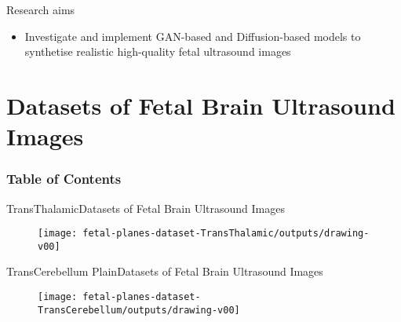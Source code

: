 {
\begin{frame}{Research aims}

\bigSizeFont
\begin{itemize}
\item Investigate and implement GAN-based and Diffusion-based models to synthetise realistic high-quality fetal ultrasound images
\end{itemize}

\end{frame}
}


\section{Datasets of Fetal Brain Ultrasound Images}
\begin{frame}
  \frametitle{Table of Contents}
  \tableofcontents[currentsection]
\end{frame}


{

\begin{frame}{TransThalamic}{Datasets of Fetal Brain Ultrasound Images}
      \begin{figure}
        \centering
        \texttt{[image: fetal-planes-dataset-TransThalamic/outputs/drawing-v00]}
      \end{figure}
\end{frame}
}

{

\begin{frame}{TransCerebellum Plain}{Datasets of Fetal Brain Ultrasound Images}
      \begin{figure}
        \centering
        \texttt{[image: fetal-planes-dataset-TransCerebellum/outputs/drawing-v00]}
      \end{figure}
\end{frame}
}





